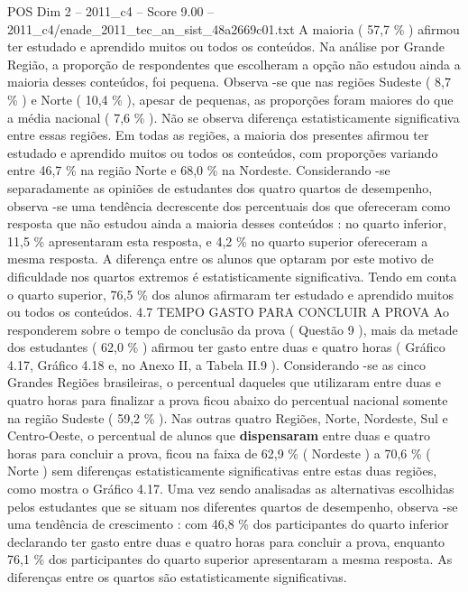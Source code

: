\begin{textsample}{POS Dim 2 – 2011\_c4 – Score 9.00 – 2011\_c4/enade\_2011\_tec\_an\_sist\_48a2669c01.txt}
A maioria ( 57,7 \% ) afirmou ter estudado e aprendido muitos ou todos os conteúdos.
Na análise por Grande Região, a proporção de respondentes que escolheram a opção não estudou ainda a maioria desses conteúdos, foi pequena.
Observa -se que nas regiões Sudeste ( 8,7 \% ) e Norte ( 10,4 \% ), apesar de pequenas, as proporções foram maiores do que a média nacional ( 7,6 \% ).
Não se observa diferença estatisticamente significativa entre essas regiões.
Em todas as regiões, a maioria dos presentes afirmou ter estudado e aprendido muitos ou todos os conteúdos, com proporções variando entre 46,7 \% na região Norte e 68,0 \% na Nordeste.
Considerando -se separadamente as opiniões de estudantes dos quatro quartos de desempenho, observa -se uma tendência decrescente dos percentuais dos que ofereceram como resposta que não estudou ainda a maioria desses conteúdos : no quarto inferior, 11,5 \% apresentaram esta resposta, e 4,2 \% no quarto superior ofereceram a mesma resposta.
A diferença entre os alunos que optaram por este motivo de dificuldade nos quartos extremos é estatisticamente significativa.
Tendo em conta o quarto superior, 76,5 \% dos alunos afirmaram ter estudado e aprendido muitos ou todos os conteúdos. 4.7 TEMPO GASTO PARA CONCLUIR A PROVA Ao responderem sobre o tempo de conclusão da prova ( Questão 9 ), mais da metade dos estudantes ( 62,0 \% ) afirmou ter gasto entre duas e quatro horas ( Gráfico 4.17, Gráfico 4.18 e, no Anexo II, a Tabela II.9 ).
Considerando -se as cinco Grandes Regiões brasileiras, o percentual daqueles que utilizaram entre duas e quatro horas para finalizar a prova ficou abaixo do percentual nacional somente na região Sudeste ( 59,2 \% ).
Nas outras quatro Regiões, Norte, Nordeste, Sul e Centro-Oeste, o percentual de alunos que \textbf{dispensaram} entre duas e quatro horas para concluir a prova, ficou na faixa de 62,9 \% ( Nordeste ) a 70,6 \% ( Norte ) sem diferenças estatisticamente significativas entre estas duas regiões, como mostra o Gráfico 4.17.
Uma vez sendo analisadas as alternativas escolhidas pelos estudantes que se situam nos diferentes quartos de desempenho, observa -se uma tendência de crescimento : com 46,8 \% dos participantes do quarto inferior declarando ter gasto entre duas e quatro horas para concluir a prova, enquanto 76,1 \% dos participantes do quarto superior apresentaram a mesma resposta.
As diferenças entre os quartos são estatisticamente significativas.

\end{textsample}
